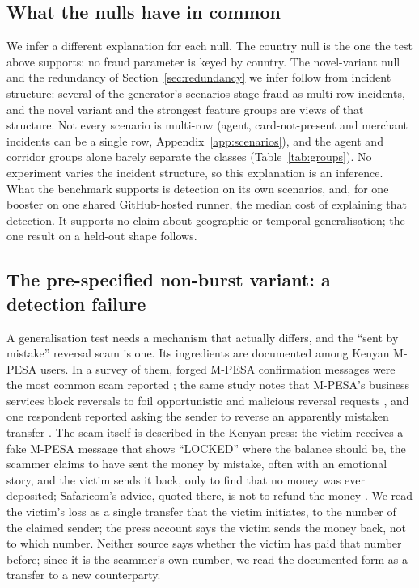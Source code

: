 \subsection{What the nulls have in common}

We infer a different explanation for each null. The country null is the one the test above
supports: no fraud parameter is keyed by country. The novel-variant null and the redundancy of
Section~\ref{sec:redundancy} we infer follow from incident structure: several of the generator's
scenarios stage fraud as multi-row incidents, and the novel variant and the
\nGroupsAboveCeiling{} strongest feature groups are views of that structure.
Not every scenario is multi-row (agent, card-not-present and merchant incidents can be a single row,
Appendix~\ref{app:scenarios}), and the agent and corridor groups alone barely separate the classes
(Table~\ref{tab:groups}). No experiment varies the incident structure, so this explanation is an
inference. What the benchmark supports is detection on its own scenarios, and, for one booster on one
shared GitHub-hosted runner, the median cost of explaining that detection. It supports no claim about geographic or temporal generalisation; the one result on a held-out
shape follows.

\subsection{The pre-specified non-burst variant: a detection failure}

A generalisation test needs a mechanism that actually differs, and the ``sent by mistake'' reversal
scam is one. Its ingredients are documented among Kenyan M-PESA users. In a survey of them,
forged M-PESA confirmation messages were the most common scam reported
\cite[Section~5.1.1]{dogan2025grift}; the same study notes that M-PESA's business services block
reversals to foil opportunistic and malicious reversal requests \cite[Section~2]{dogan2025grift},
and one respondent reported asking the sender to reverse an apparently mistaken transfer
\cite[Section~5.3.3]{dogan2025grift}. The scam itself is described in the Kenyan press: the victim
receives a fake M-PESA message that shows ``LOCKED'' where the balance should be, the scammer claims
to have sent the money by mistake, often with an emotional story, and the victim sends it back, only
to find that no money was ever deposited; Safaricom's advice, quoted there, is not to refund the
money \cite{star2025mpesa}. We read the victim's loss as a single transfer that the victim
initiates, to the number of the claimed sender; the press account says the victim sends the money
back, not to which number. Neither source says whether the victim has paid that
number before; since it is the scammer's own number, we read the documented form as a transfer to a
new counterparty.

